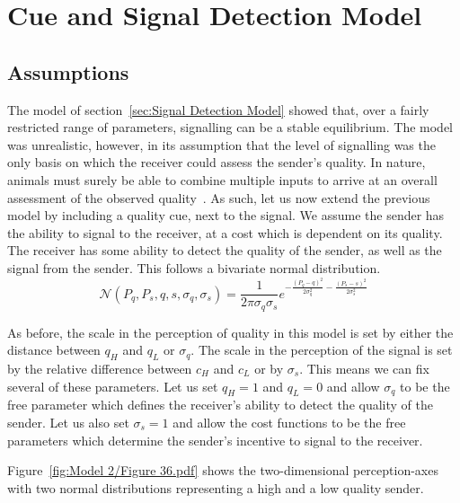 \documentclass[a4paper,12pt]{article}
\numberwithin{equation}{section}
\begin{document}
\newpage\clearpage


\section{Cue and Signal Detection Model}
\label{sec:Cue and Signal Detection Model}
\subsection{Assumptions}
\label{sec:CueandSignalDetectionModel/Assumptions}

The model of section~\ref{sec:Signal Detection Model} showed that, over a fairly restricted range of parameters, signalling can be a stable equilibrium. The model was unrealistic, however, in its assumption that the level of signalling was the only basis on which the receiver could assess the sender's quality. In nature, animals must surely be able to combine multiple inputs to arrive at an overall assessment of the observed quality~\cite{Jennions1997, Candolin2003}. As such, let us now extend the previous model by including a quality cue, next to the signal. We assume the sender has the ability to signal to the receiver, at a cost which is dependent on its quality. The receiver has some ability to detect the quality of the sender, as well as the signal from the sender. This follows a bivariate normal distribution.
\begin{equation}
\label{eq:CueandSignalDetectionModel/Normal}
\mathcal{N}(P_{q}, P_{s}, q, s, \sigma_{q}, \sigma_{s}) = \frac{1}{2 \pi \sigma_{q} \sigma_{s}} e^{-\frac{(P_{q}-q)^2}{2 \sigma_{q}^2}-\frac{(P_{s}-s)^2}{2 \sigma_{s}^2}}
\end{equation}

As before, the scale in the perception of quality in this model is set by either the distance between $q_{H}$ and $q_{L}$ or $\sigma_{q}$. The scale in the perception of the signal is set by the relative difference between $c_{H}$ and $c_{L}$ or by $\sigma_{s}$. This means we can fix several of these parameters. Let us set $q_{H}=1$ and $q_{L}=0$ and allow $\sigma_{q}$ to be the free parameter which defines the receiver's ability to detect the quality of the sender. Let us also set $\sigma_{s}=1$ and allow the cost functions to be the free parameters which determine the sender's incentive to signal to the receiver.

Figure~\ref{fig:Model 2/Figure 36.pdf} shows the two-dimensional perception-axes with two normal distributions representing a high and a low quality sender.
\end{document}
